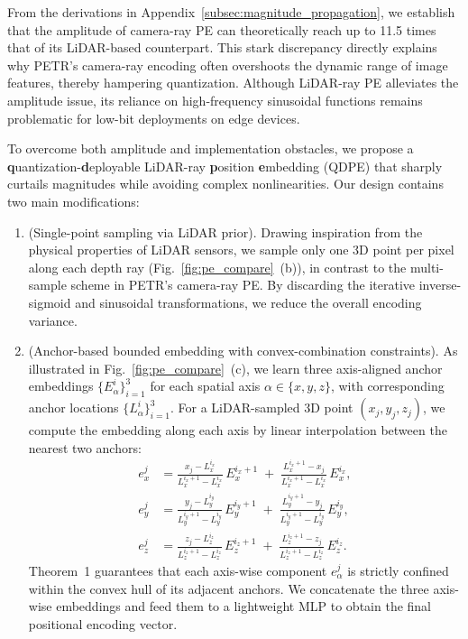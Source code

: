 From the derivations in Appendix~\ref{subsec:magnitude_propagation}, we establish that the amplitude of camera-ray PE can theoretically reach up to 11.5 times that of its LiDAR-based counterpart. This stark discrepancy directly explains why PETR’s camera-ray encoding often overshoots the dynamic range of image features, thereby hampering quantization. Although LiDAR-ray PE alleviates the amplitude issue, its reliance on high-frequency sinusoidal functions remains problematic for low-bit deployments on edge devices. 

To overcome both amplitude and implementation obstacles, we propose a \textbf{q}uantization-\textbf{d}eployable LiDAR-ray \textbf{p}osition \textbf{e}mbedding (QDPE) that sharply curtails magnitudes while avoiding complex nonlinearities. Our design contains two main modifications: 
\begin{enumerate}
    \item (Single-point sampling via LiDAR prior). 
    Drawing inspiration from the physical properties of LiDAR sensors, we sample only one 3D point per pixel along each depth ray (Fig.~\ref{fig:pe_compare}~(b)), in contrast to the multi-sample scheme in PETR’s camera-ray PE. By discarding the iterative inverse-sigmoid and sinusoidal transformations, we reduce the overall encoding variance.

    \item (Anchor-based bounded embedding with convex-combination constraints). 
    As illustrated in Fig.~\ref{fig:pe_compare}~(c), we learn three axis-aligned anchor embeddings $\{E_\alpha^i\}_{i=1}^3$ for each spatial axis $\alpha \in \{x,y,z\}$, with corresponding anchor locations $\{L_\alpha^i\}_{i=1}^3$. For a LiDAR-sampled 3D point $(x_j,y_j,z_j)$, we compute the embedding along each axis by linear interpolation between the nearest two anchors:
    \begin{equation}
    \begin{aligned}
        e_x^j &= \frac{x_j - L_x^{i_x}}{L_x^{i_x+1} - L_x^{i_x}}\,E_x^{i_x+1} 
        \;+\;\frac{L_x^{i_x+1} - x_j}{L_x^{i_x+1} - L_x^{i_x}}\,E_x^{i_x}, \\ 
        e_y^j &= \frac{y_j - L_y^{i_y}}{L_y^{i_y+1} - L_y^{i_y}}\,E_y^{i_y+1} 
        \;+\;\frac{L_y^{i_y+1} - y_j}{L_y^{i_y+1} - L_y^{i_y}}\,E_y^{i_y}, \\ 
        e_z^j &= \frac{z_j - L_z^{i_z}}{L_z^{i_z+1} - L_z^{i_z}}\,E_z^{i_z+1} 
        \;+\;\frac{L_z^{i_z+1} - z_j}{L_z^{i_z+1} - L_z^{i_z}}\,E_z^{i_z}.
    \end{aligned}
    \end{equation}
    Theorem~1 guarantees that each axis-wise component $e_\alpha^j$ is strictly confined within the convex hull of its adjacent anchors. We concatenate the three axis-wise embeddings and feed them to a lightweight MLP to obtain the final positional encoding vector.
\end{enumerate}

